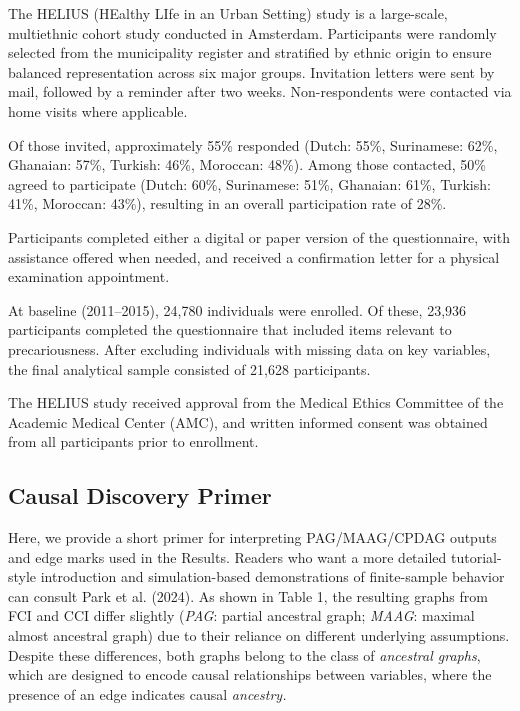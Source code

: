\documentclass[
]{article}
\begin{document}
The HELIUS (HEalthy LIfe in an Urban Setting) study is a large-scale,
multiethnic cohort study conducted in Amsterdam. Participants were
randomly selected from the municipality register and stratified by
ethnic origin to ensure balanced representation across six major groups.
Invitation letters were sent by mail, followed by a reminder after two
weeks. Non-respondents were contacted via home visits where applicable.

Of those invited, approximately 55\% responded (Dutch: 55\%, Surinamese:
62\%, Ghanaian: 57\%, Turkish: 46\%, Moroccan: 48\%). Among those
contacted, 50\% agreed to participate (Dutch: 60\%, Surinamese: 51\%,
Ghanaian: 61\%, Turkish: 41\%, Moroccan: 43\%), resulting in an overall
participation rate of 28\%.

Participants completed either a digital or paper version of the
questionnaire, with assistance offered when needed, and received a
confirmation letter for a physical examination appointment.

At baseline (2011--2015), 24,780 individuals were enrolled. Of these,
23,936 participants completed the questionnaire that included items
relevant to precariousness. After excluding individuals with missing
data on key variables, the final analytical sample consisted of 21,628
participants.

The HELIUS study received approval from the Medical Ethics Committee of
the Academic Medical Center (AMC), and written informed consent was
obtained from all participants prior to enrollment.

\subsection{Causal Discovery Primer}\label{sec-causalprimer}

\textcolor{BrickRed}{Here, we provide a short primer for interpreting PAG/MAAG/CPDAG outputs and edge marks used in the Results. Readers who want a more detailed tutorial-style introduction and simulation-based demonstrations of finite-sample behavior can consult}
Park et al. (2024). As shown in Table 1, the resulting graphs from FCI
and CCI differ slightly (\emph{PAG}: partial ancestral graph;
\emph{MAAG}: maximal almost ancestral graph) due to their reliance on
different underlying assumptions. Despite these differences, both graphs
belong to the class of \emph{ancestral graphs}, which are designed to
encode causal relationships between variables, where the presence of an
edge indicates causal \emph{ancestry.}
\end{document}
